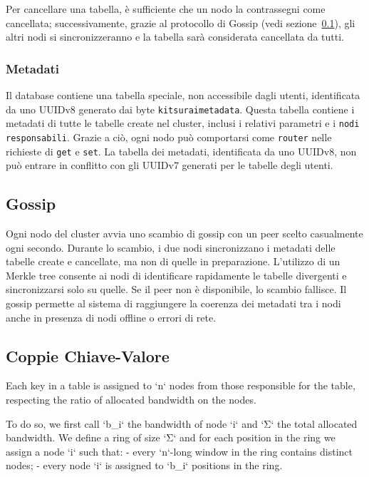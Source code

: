 Per cancellare una tabella, è sufficiente che un nodo la contrassegni come cancellata; successivamente, grazie al protocollo di Gossip (vedi sezione~\ref{subsec:gossip}), gli altri nodi si sincronizzeranno e la tabella sarà considerata cancellata da tutti.

\subsubsection{Metadati}
\label{subsubsec:metadati}

Il database contiene una tabella speciale, non accessibile dagli utenti, identificata da uno UUIDv8 generato dai byte \texttt{kitsuraimetadata}.
Questa tabella contiene i metadati di tutte le tabelle create nel cluster, inclusi i relativi parametri e i \texttt{nodi responsabili}.
Grazie a ciò, ogni nodo può comportarsi come \texttt{router} nelle richieste di \texttt{get} e \texttt{set}.
La tabella dei metadati, identificata da uno UUIDv8, non può entrare in conflitto con gli UUIDv7 generati per le tabelle degli utenti.

\subsection{Gossip}
\label{subsec:gossip}

Ogni nodo del cluster avvia uno scambio di gossip con un peer scelto casualmente ogni secondo.
Durante lo scambio, i due nodi sincronizzano i metadati delle tabelle create e cancellate, ma non di quelle in preparazione.
L'utilizzo di un Merkle tree consente ai nodi di identificare rapidamente le tabelle divergenti e sincronizzarsi solo su quelle.
Se il peer non è disponibile, lo scambio fallisce.
Il gossip permette al sistema di raggiungere la coerenza dei metadati tra i nodi anche in presenza di nodi offline o errori di rete.

\subsection{Coppie Chiave-Valore}
\label{subsec:coppie-chiave-valore}

Each key in a table is assigned to `n` nodes from those responsible for the table,
respecting the ratio of allocated bandwidth on the nodes.

To do so, we first call `b_i` the bandwidth of node `i` and `Σ` the total allocated bandwidth.
We define a ring of size `Σ` and for each position in the ring we assign a node `i` such that:
- every `n`-long window in the ring contains distinct nodes;
- every node `i` is assigned to `b_i` positions in the ring.

